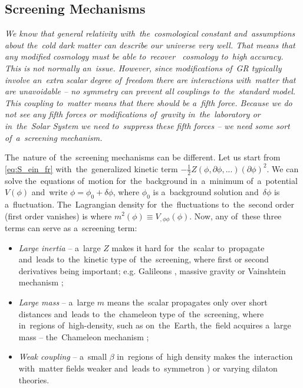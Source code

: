 \subsection{Screening Mechanisms}
{\itshape
We know that general relativity with~the~cosmological constant and~assumptions about the~cold dark matter can describe our universe very well. That means that any modified cosmology must be able to~recover \LCDM\ cosmology to~high accuracy. This is not normally an~issue. However, since modifications of~GR typically involve an~extra scalar degree of~freedom there are interactions with~matter that are unavoidable -- no symmetry can prevent all couplings to~the~standard model. This coupling to~matter means that there should be a~fifth force. Because we do not see any fifth forces or modifications of~gravity in~the~laboratory or in~the~Solar System we need to~suppress these fifth forces -- we need some sort of~a~\textit{screening mechanism}.

The~nature of~the~screening mechanisms can be different. Let us start from \eqref{eq:S_ein_fr} with~the~generalized kinetic term $-\frac12 Z(\phi,\partial\phi,...)(\partial\phi)^2$. We can solve the~equations of~motion for~the~background in~a~minimum of~a~potential $V(\phi)$ and~write $\phi=\phi_0+\delta\phi$, where $\phi_0$ is a~background solution and~$\delta\phi$ is a~fluctuation. The~Lagrangian density for~the~fluctuations to~the~second order (first order vanishes) is
where $m^2(\phi)\equiv V_{,\phi\phi}(\phi)$. Now, any of~these three terms can serve as a~screening term:
\begin{itemize}
	\item  \textit{Large inertia} -- a~large $Z$ makes it hard for~the~scalar to~propagate and~leads to~the~kinetic type of~the~screening, where first or second derivatives being important; e.g. Galileons \parencite{2009PhRvD..79f4036N}, massive gravity \parencite{2012RvMP...84..671H} or Vainshtein mechanism \parencite{2013CQGra..30r4001B};
	\item \textit{Large mass} --  a~large $m$ means the~scalar propagates only over short distances and~leads to~the~chameleon type of~the~screening, where in~regions of~high-density, such as on~the~Earth, the~field acquires a~large mass -- the~Chameleon mechanism \parencite{Waterhouse:2006wv};
	\item \textit{Weak coupling} -- a~small $\beta$ in~regions of~high density makes the~interaction with~matter fields weaker and~leads to~symmetron \parencite{2010PhRvL.104w1301H}) or varying dilaton \parencite{Damour:1994zq,2011PhRvD..83j4026B} theories.
\end{itemize}
} 
